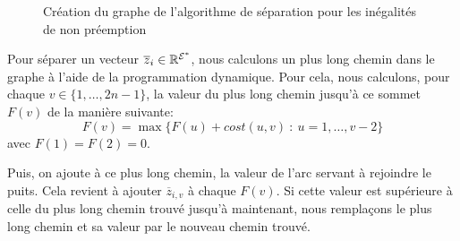 \begin{ex}
\begin{figure}[!htb]
  \caption{Création du graphe de l'algorithme de séparation pour les
      inégalités de non préemption}
    \label{fig:algo_sep}
  \end{figure}
\end{ex}

Pour séparer un vecteur $\overline{z}_i \in \mathbb{R}^{{\cal E}^*}$, nous
calculons un plus long chemin dans le graphe à l'aide de la
programmation dynamique. Pour cela, nous calculons, pour chaque $v \in
\{1,\dots,2n-1\}$, la valeur  du plus long chemin jusqu'à ce sommet
$F(v)$ de la manière suivante:
\begin{equation}
  F(v) = \max\{ F(u) + cost (u,v) \ : \ u=1,\dots,v-2 \}
\end{equation}
avec $F(1)=F(2)=0$. 

Puis, on ajoute à ce plus long chemin, la valeur de l'arc servant à
rejoindre le puits. Cela revient à ajouter $\overline{z}_{i,v}$ à
chaque $F(v)$. Si cette valeur est supérieure à celle du
plus long chemin trouvé jusqu'à maintenant, nous remplaçons le plus
long chemin et sa valeur par le nouveau chemin trouvé.

